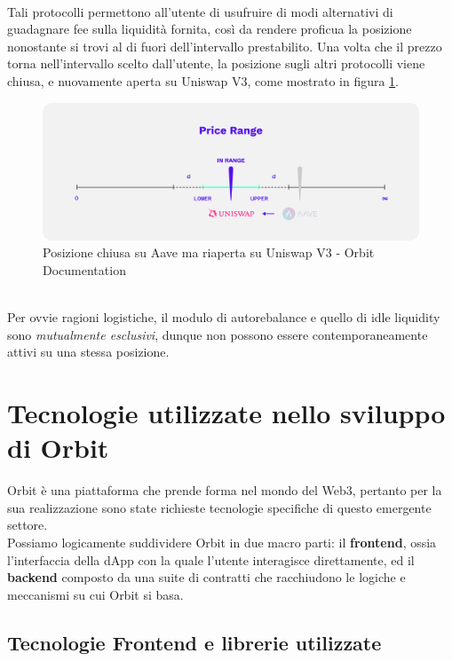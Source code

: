\documentclass[12pt,a4paper]{report}
\begin{document}
\noindent \\Tali protocolli permettono all'utente di usufruire di modi alternativi di guadagnare fee sulla liquidità fornita, così da rendere proficua la posizione nonostante si trovi al di fuori dell'intervallo prestabilito.
Una volta che il prezzo torna nell'intervallo scelto dall'utente, la posizione sugli altri protocolli viene chiusa, e nuovamente aperta su Uniswap V3, come mostrato in figura \ref{fig:uniswap_back}.

\begin{figure}[H]
  \includegraphics[scale=0.3]{uniswap_back.png}
  \centering
  \caption{Posizione chiusa su Aave ma riaperta su Uniswap V3 - Orbit Documentation}
  \label{fig:uniswap_back}
\end{figure}

\noindent \\Per ovvie ragioni logistiche, il modulo di autorebalance e quello di idle liquidity sono \textit{mutualmente esclusivi}, dunque non possono essere contemporaneamente attivi su una stessa posizione.
\chapter{Tecnologie utilizzate nello sviluppo di Orbit}

Orbit è una piattaforma che prende forma nel mondo del Web3, pertanto per la sua realizzazione sono state richieste tecnologie specifiche di questo emergente settore.
\\Possiamo logicamente suddividere Orbit in due macro parti: il \textbf{frontend}, ossia l'interfaccia della dApp\cite{orbit_website} con la quale l'utente interagisce direttamente, ed il \textbf{backend} composto da una suite di contratti che racchiudono le logiche e meccanismi su cui Orbit si basa.

\section{Tecnologie Frontend e librerie utilizzate}
\end{document}
